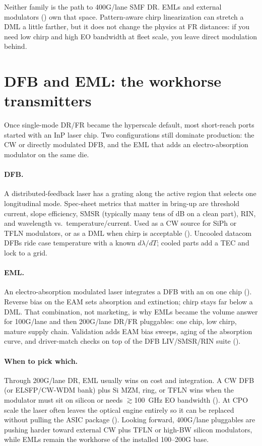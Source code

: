 Neither family is the path to 400G/lane SMF DR. EMLs and external modulators
() own that space. Pattern-aware
chirp linearization can stretch a DML a little farther, but it does not change
the physics at FR distances: if you need low chirp and high EO bandwidth at
fleet scale, you leave direct modulation behind.

\section{DFB and EML: the workhorse transmitters}
\label{sec:dfb-eml}

Once single-mode DR/FR became the hyperscale default, most short-reach ports
started with an InP laser chip. Two configurations still dominate production:
the CW or directly modulated DFB, and the EML that adds an electro-absorption
modulator on the same die.

\paragraph{DFB.} A distributed-feedback laser has a grating along the active region
that selects one longitudinal mode. Spec-sheet metrics that matter in bring-up are
threshold current, slope efficiency, SMSR (typically many tens of dB on a clean
part), RIN, and wavelength vs.\ temperature/current. Used as a CW source for SiPh
or TFLN modulators, or as a DML when chirp is acceptable ().
Uncooled datacom DFBs ride case temperature with a known $d\lambda/dT$; cooled
parts add a TEC and lock to a grid.

\paragraph{EML.} An electro-absorption modulated laser integrates a DFB with an
 on one chip (). Reverse bias on the EAM sets absorption
and extinction; chirp stays far below a DML. That combination, not marketing, is
why EMLs became the volume answer for 100G/lane and then 200G/lane DR/FR
pluggables: one chip, low chirp, mature supply chain. Validation adds EAM bias
sweeps, aging of the absorption curve, and driver-match checks on top of the DFB
LIV/SMSR/RIN suite ().

\paragraph{When to pick which.} Through 200G/lane DR, EML usually wins on cost and
integration. A CW DFB (or ELSFP/CW-WDM bank) plus Si MZM, ring, or TFLN wins when
the modulator must sit on silicon or needs $\gtrsim$100~GHz EO bandwidth
(). At CPO scale the laser
often leaves the optical engine entirely so it can be replaced without pulling the
ASIC package (). Looking forward, 400G/lane pluggables are pushing
harder toward external CW plus TFLN or high-BW silicon modulators, while EMLs
remain the workhorse of the installed 100--200G base.

